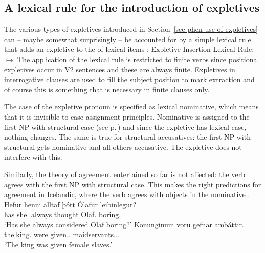 \subsection{A lexical rule for the introduction of expletives}
\label{sec-analysis-expletives}

The various types of expletives introduced in Section~\ref{sec-phen-use-of-expletives} can -- maybe somewhat surprisingly -- be
accounted for by a simple lexical rule that adds an expletive to the \argstl of lexical items
\citep[]{MOe2011a}:
\ea
\label{positional-expl-lr}
Expletive Insertion Lexical Rule:\\
 $\mapsto$
\z
The application of the lexical rule is restricted to finite verbs since positional expletives occur
in V2 sentences and these are always finite. Expletives in interrogative clauses are used to fill
the subject position to mark extraction and of course this is something that is necessary in finite
clauses only.

The case of the expletive pronoun is specified as lexical nominative, which means that it is
invisible to case assignment principles. Nominative is assigned to the first NP with structural case
(see p.\,\pageref{case-p}) and since the expletive has lexical case, nothing changes. The same is
true for structural accusatives: the first NP with structural gets nominative and all others
accusative. The expletive does not interfere with this.

Similarly, the theory of agreement entertained so far is not affected: the verb agrees with the
first NP with structural case. This makes the right predictions for agreement in Icelandic, where
the verb agrees with objects in the nominative \citep[]{ZMT85a}.
\eal
\ex
\gll Hefur henni      alltaf þótt    Ólafur      leibinlegur?\footnotemark\\
     has   she.\DAT{} always thought Olaf.\NOM{} boring.\NOM{}\\\icelandic
{}
\glt `Has she always considered Olaf boring?'
\ex
\label{ex-dat-subj-passive-ditransitive-icelandic-two}
\gll Konunginum voru gefnar ambáttir.\footnotemark\\
     the.king.\DAT{} were given.\F.\PL{} maidservants.\NOM.\F.\PL\\
\glt `The king was given female slaves.'
\zl

